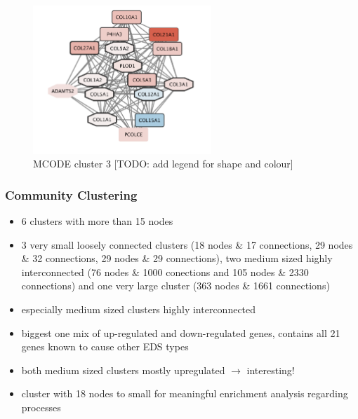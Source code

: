\begin{figure}[htb!]
	\centering
	\includegraphics[width=0.6\textwidth]{fig/MCODE-cluster3.png}
	\caption{MCODE cluster 3 [TODO: add legend for shape and colour]}
	\label{fig:mcode3}
\end{figure}

\subsubsection{Community Clustering}

\begin{itemize}
	\item 6 clusters with more than 15 nodes
	\item 3 very small loosely connected clusters (18 nodes \& 17 connections, 29 nodes \& 32 connections, 29 nodes \& 29 connections), two medium sized highly interconnected (76 nodes \& 1000 conections and 105 nodes \& 2330 connections) and one very large cluster (363 nodes \& 1661 connections)
	\item especially medium sized clusters highly interconnected
	\item biggest one mix of up-regulated and down-regulated genes, contains all 21 genes known to cause other EDS types
	\item both medium sized clusters mostly upregulated $\rightarrow$ interesting!
	\item cluster with 18 nodes to small for meaningful enrichment analysis regarding processes
\end{itemize}